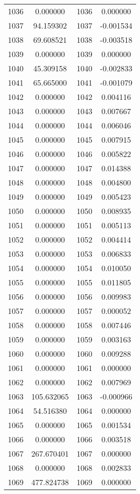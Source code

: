 \documentclass[12pt]{article}
\begin{document}
\begin{longtable}{@{}cccc@{}}
1036 & 0.000000 & 1036 & 0.000000 \\
1037 & 94.159302 & 1037 & -0.001534 \\
1038 & 69.608521 & 1038 & -0.003518 \\
1039 & 0.000000 & 1039 & 0.000000 \\
1040 & 45.309158 & 1040 & -0.002833 \\
1041 & 65.665000 & 1041 & -0.001079 \\
1042 & 0.000000 & 1042 & 0.004116 \\
1043 & 0.000000 & 1043 & 0.007667 \\
1044 & 0.000000 & 1044 & 0.006046 \\
1045 & 0.000000 & 1045 & 0.007915 \\
1046 & 0.000000 & 1046 & 0.005822 \\
1047 & 0.000000 & 1047 & 0.014388 \\
1048 & 0.000000 & 1048 & 0.004800 \\
1049 & 0.000000 & 1049 & 0.005423 \\
1050 & 0.000000 & 1050 & 0.008935 \\
1051 & 0.000000 & 1051 & 0.005113 \\
1052 & 0.000000 & 1052 & 0.004414 \\
1053 & 0.000000 & 1053 & 0.006833 \\
1054 & 0.000000 & 1054 & 0.010050 \\
1055 & 0.000000 & 1055 & 0.011805 \\
1056 & 0.000000 & 1056 & 0.009983 \\
1057 & 0.000000 & 1057 & 0.000052 \\
1058 & 0.000000 & 1058 & 0.007446 \\
1059 & 0.000000 & 1059 & 0.003163 \\
1060 & 0.000000 & 1060 & 0.009288 \\
1061 & 0.000000 & 1061 & 0.000000 \\
1062 & 0.000000 & 1062 & 0.007969 \\
1063 & 105.632065 & 1063 & -0.000966 \\
1064 & 54.516380 & 1064 & 0.000000 \\
1065 & 0.000000 & 1065 & 0.001534 \\
1066 & 0.000000 & 1066 & 0.003518 \\
1067 & 267.670401 & 1067 & 0.000000 \\
1068 & 0.000000 & 1068 & 0.002833 \\
1069 & 477.824738 & 1069 & 0.000000 \\

\end{longtable}
\end{document}
